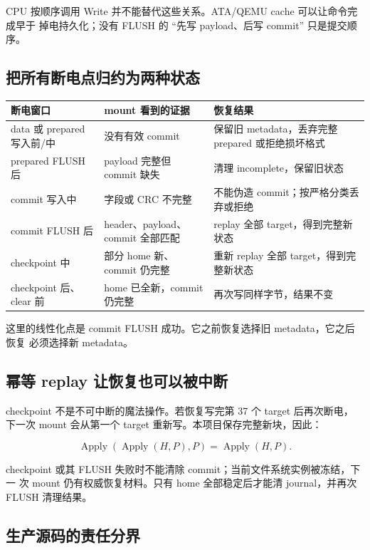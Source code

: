 CPU 按顺序调用 Write 并不能替代这些关系。ATA/QEMU cache 可以让命令完成早于
掉电持久化；没有 FLUSH 的 ``先写 payload、后写 commit'' 只是提交顺序。

\subsection{把所有断电点归约为两种状态}

\begin{center}
\begin{tabularx}{\textwidth}{p{}XX}
\toprule
断电窗口 & mount 看到的证据 & 恢复结果\\
\midrule
data 或 prepared 写入前/中 &
没有有效 commit &
保留旧 metadata，丢弃完整 prepared 或拒绝损坏格式\\
prepared FLUSH 后 &
payload 完整但 commit 缺失 &
清理 incomplete，保留旧状态\\
commit 写入中 &
字段或 CRC 不完整 &
不能伪造 commit；按严格分类丢弃或拒绝\\
commit FLUSH 后 &
header、payload、commit 全部匹配 &
replay 全部 target，得到完整新状态\\
checkpoint 中 &
部分 home 新、commit 仍完整 &
重新 replay 全部 target，得到完整新状态\\
checkpoint 后、clear 前 &
home 已全新，commit 仍完整 &
再次写同样字节，结果不变\\
\bottomrule
\end{tabularx}
\end{center}

这里的线性化点是 commit FLUSH 成功。它之前恢复选择旧 metadata，它之后恢复
必须选择新 metadata。

\subsection{幂等 replay 让恢复也可以被中断}

checkpoint 不是不可中断的魔法操作。若恢复写完第 37 个 target 后再次断电，
下一次 mount 会从第一个 target 重新写。本项目保存完整新块，因此：

\[
\operatorname{Apply}(\operatorname{Apply}(H,P),P)
=\operatorname{Apply}(H,P).
\]

checkpoint 或其 FLUSH 失败时不能清除 commit；当前文件系统实例被冻结，下一
次 mount 仍有权威恢复材料。只有 home 全部稳定后才能清 journal，并再次
FLUSH 清理结果。

\subsection{生产源码的责任分界}

